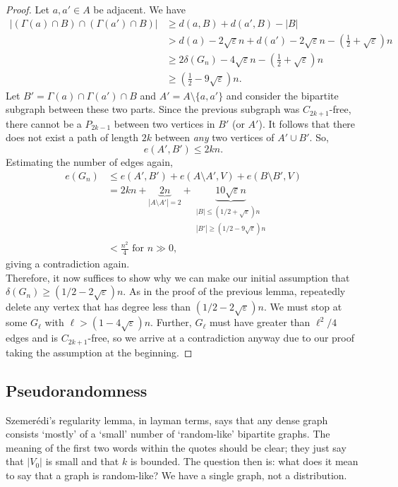 \begin{proof}
				Let $a,a'\in A$ be adjacent. We have
				\begin{align*}
					|(\Gamma(a)\cap B) \cap (\Gamma(a')\cap B)| &\ge d(a,B) + d(a',B) - |B| \\
						&> d(a) - 2\sqrt{\varepsilon}n + d(a') - 2\sqrt{\varepsilon}n - \left( \frac{1}{2} + \sqrt{\varepsilon} \right) n \\
						&\ge 2\delta(G_n) - 4\sqrt{\varepsilon}n - \left( \frac{1}{2} + \sqrt{\varepsilon} \right) n \\
						&\ge \left( \frac{1}{2} - 9\sqrt{\varepsilon} \right) n.
				\end{align*}
				Let $B' = \Gamma(a) \cap \Gamma(a') \cap B$ and $A' = A \setminus \{a,a'\}$ and consider the bipartite subgraph between these two parts. Since the previous subgraph was $C_{2k+1}$-free, there cannot be a $P_{2k-1}$ between two vertices in $B'$ (or $A'$). It follows that there does not exist a path of length $2k$ between \emph{any} two vertices of $A'\cup B'$. So,
				\[ e(A',B') \le 2kn. \]
				Estimating the number of edges again,
				\begin{align*}
				 	e(G_n) &\le e(A',B') + e(A\setminus A', V) + e(B\setminus B', V) \\
				 		&= 2kn + \underbrace{2n}_{|A\setminus A'| = 2} + \underbrace{10\sqrt{\varepsilon}n}_{\substack{|B|\le (1/2+\sqrt{\varepsilon})n \\ |B'| \ge (1/2-9\sqrt{\varepsilon})n}} \\
				 		&< \frac{n^2}{4}\text{ for $n\gg 0$},
				\end{align*}
				giving a contradiction again.\\

				Therefore, it now suffices to show why we can make our initial assumption that $\delta(G_n) \ge (1/2 - 2\sqrt{\varepsilon})n$. As in the proof of the previous lemma, repeatedly delete any vertex that has degree less than $(1/2 - 2\sqrt{\varepsilon})n$. We must stop at some $G_\ell$ with $\ell > (1-4\sqrt{\varepsilon})n$. Further, $G_\ell$ must have greater than $\ell^2/4$ edges and is $C_{2k+1}$-free, so we arrive at a contradiction anyway due to our proof taking the assumption at the beginning.
			\end{proof}

	\subsection{Pseudorandomness}

		Szemer\'{e}di's regularity lemma, in layman terms, says that any dense graph consists `mostly' of a `small' number of `random-like' bipartite graphs. The meaning of the first two words within the quotes should be clear; they just say that $|V_0|$ is small and that $k$ is bounded. The question then is: what does it mean to say that a graph is random-like? We have a single graph, not a distribution.

